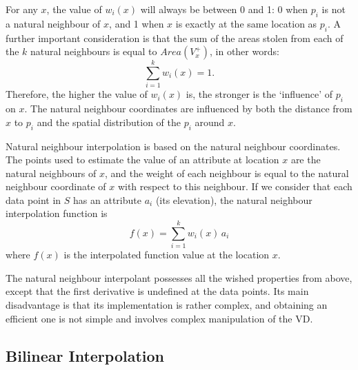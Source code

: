 For any $x$, the value of $w_{i}(x)$ will always be between 0 and 1: 0 when $p_{i}$ is not a natural neighbour of $x$, and 1 when $x$ is exactly at the same location as $p_{i}$. 
A further important consideration is that the sum of the areas stolen from each of the $k$ natural neighbours is equal to $Area(V^{+}_{x})$, in other words:
\begin{equation}
  \sum_{i=1}^{k} w_{i}(x) = 1.
\end{equation}
Therefore, the higher the value of $w_{i}(x)$ is, the stronger is the `influence' of $p_{i}$ on $x$. 
The natural neighbour coordinates are influenced by both the distance from $x$ to $p_{i}$ and the spatial distribution of the $p_{i}$ around $x$. 

%

Natural neighbour interpolation is based on the natural neighbour coordinates. 
The points used to estimate the value of an attribute at location $x$ are the natural neighbours of $x$, and the weight of each neighbour is equal to the natural neighbour coordinate of $x$ with respect to this neighbour. 
If we consider that each data point in $S$ has an attribute $a_{i}$ (its elevation), the natural neighbour interpolation function is
\begin{equation}
  f(x) = \sum_{i=1}^{k} w_{i}(x) \, a_{i}
  \label{eq:nni}
\end{equation}
where $f(x)$ is the interpolated function value at the location $x$. 

The natural neighbour interpolant possesses all the wished properties from above, except that the first derivative is undefined at the data points. 
Its main disadvantage is that its implementation is rather complex, and obtaining an efficient one is not simple and involves complex manipulation of the VD.



\subsection{Bilinear Interpolation}

